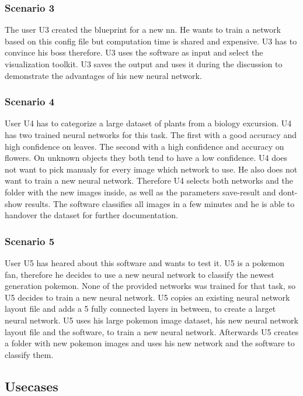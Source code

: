 \documentclass[parskip=full]{scrartcl}
\begin{document}
\subsubsection{Scenario 3}
The user U3 created the blueprint for a new nn.
He wants to train a network based on this config file but computation time is shared and expensive. U3 has to convince his boss therefore.
U3 uses the software as input and select the visualization toolkit.
U3 saves the output and uses it during the discussion to demonstrate the advantages of his new neural network.
\subsubsection{Scenario 4}
User U4 has to categorize a large dataset of plants from a biology excursion. U4 has two trained neural networks for this task. The first with a good accuracy and high confidence on leaves. The second with a high confidence and accuracy on flowers. On unknown objects they both tend to have a low confidence. U4 does not want to pick manualy for every image which network to use. He also does not want to train a new neural network. Therefore U4 selects both networks and the folder with the new images inside, as well as the parameters save-result and dont-show results. The software classifies all images in a few minutes and he is able to handover the dataset for further documentation.
\subsubsection{Scenario 5}
User U5 has heared about this software and wants to test it.
U5 is a pokemon fan, therefore he decides to use a new neural network to classify the newest generation pokemon. None of the provided networks was trained for that task, so U5 decides to train a new neural network. U5 copies an existing neural network layout file and adds a 5 fully connected layers in between, to create a larget neural network. U5 uses his large pokemon image dataset, his new neural network layout file and the software, to train a new neural network. 
Afterwards U5 creates a folder with new pokemon images and uses his new network and the software to classify them.
\subsection{Usecases}
\end{document}

